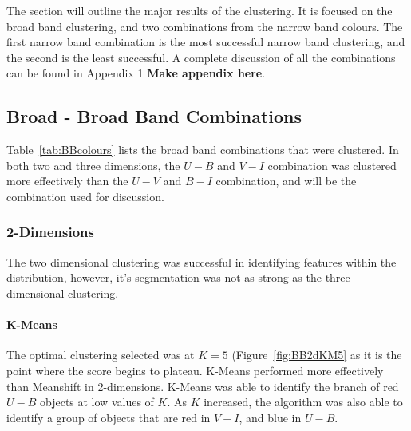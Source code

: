 
The section will outline the major results of the clustering. 
It is focused on the broad band clustering, and two combinations from the narrow band colours.
The first narrow band combination is the most successful narrow band clustering, and the second is the least successful.
A complete discussion of all the combinations can be found in Appendix 1 \textbf{Make appendix here}.

\subsection{Broad - Broad Band Combinations}
Table~\ref{tab:BBcolours} lists the broad band combinations that were clustered. 
In both two and three dimensions, the $U - B$ and $V - I$ combination was clustered more effectively than the $U - V$ and $B - I$ combination, and will be the combination used for discussion.

\subsubsection{2-Dimensions}
The two dimensional clustering was successful in identifying features within the distribution, however, it's segmentation was not as strong as the three dimensional clustering. 

\paragraph{K-Means}
The optimal clustering selected was at $K=5$ (Figure~\ref{fig:BB2dKM5} as it is the point where the score begins to plateau.
K-Means performed more effectively than Meanshift in 2-dimensions.
K-Means was able to identify the branch of red $U - B$ objects at low values of $K$.
As $K$ increased, the algorithm was also able to identify a group of objects that are red in $V - I$, and blue in $U - B$. 

